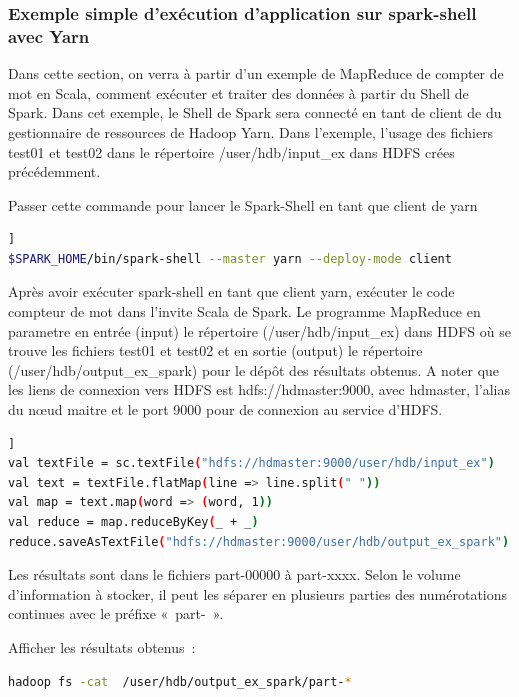 \documentclass[12pt,english]{book}
\begin{document}
\subsubsection{Exemple simple d’exécution d’application sur spark-shell avec Yarn}

Dans cette section, on verra à partir d’un exemple de MapReduce de compter de mot en Scala, comment exécuter et traiter des données à partir du Shell de Spark.
Dans cet exemple, le Shell de Spark sera connecté en tant de client de du gestionnaire de ressources de Hadoop Yarn.
Dans l’exemple, l’usage des fichiers test01 et test02 dans le répertoire /user/hdb/input\_ex dans HDFS crées précédemment.

Passer cette commande pour lancer le Spark-Shell en tant que client de yarn

\begin{lstlisting}[language=bash, frame=single, breaklines=true, postbreak=\mbox{\textcolor{red}{$\hookrightarrow$}\space}]]
$SPARK_HOME/bin/spark-shell --master yarn --deploy-mode client
\end{lstlisting}

Après avoir exécuter spark-shell en tant que client yarn, exécuter le code compteur de mot dans l’invite Scala de Spark.
Le programme MapReduce en parametre en entrée (input) le répertoire (/user/hdb/input\_ex) dans HDFS où se trouve les fichiers test01 et test02 et en sortie (output) le répertoire (/user/hdb/output\_ex\_spark) pour le dépôt des résultats obtenus.
A noter que les liens de connexion vers HDFS est hdfs://hdmaster:9000, avec hdmaster, l’alias du nœud maitre et le port 9000 pour de connexion au service d’HDFS.

\begin{lstlisting}[language=bash, frame=single, breaklines=true, postbreak=\mbox{\textcolor{red}{$\hookrightarrow$}\space}]]
val textFile = sc.textFile("hdfs://hdmaster:9000/user/hdb/input_ex")
val text = textFile.flatMap(line => line.split(" "))
val map = text.map(word => (word, 1))
val reduce = map.reduceByKey(_ + _)
reduce.saveAsTextFile("hdfs://hdmaster:9000/user/hdb/output_ex_spark")
\end{lstlisting}

Les résultats sont dans le fichiers part-00000 à part-xxxx.
Selon le volume d’information à stocker, il peut les séparer en plusieurs parties des numérotations continues avec le préfixe « part- ».

Afficher les résultats obtenus :

\begin{lstlisting}[language=bash, frame=single]
hadoop fs -cat  /user/hdb/output_ex_spark/part-*
\end{lstlisting}
\end{document}
